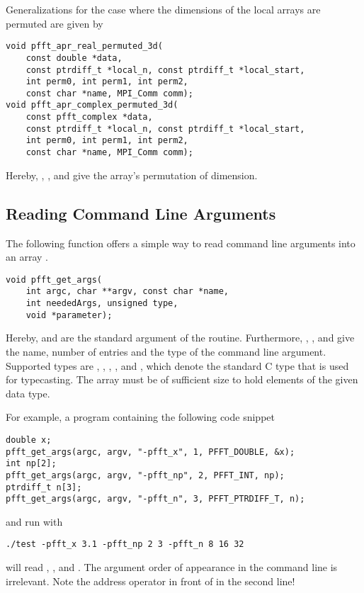 Generalizations for the case where the dimensions of the local arrays are permuted are given by
\begin{lstlisting}
void pfft_apr_real_permuted_3d(
    const double *data,
    const ptrdiff_t *local_n, const ptrdiff_t *local_start,
    int perm0, int perm1, int perm2,
    const char *name, MPI_Comm comm);
void pfft_apr_complex_permuted_3d(
    const pfft_complex *data,
    const ptrdiff_t *local_n, const ptrdiff_t *local_start,
    int perm0, int perm1, int perm2,
    const char *name, MPI_Comm comm);
\end{lstlisting}
Hereby, , , and  give the array's permutation of dimension.





\subsection{Reading Command Line Arguments}
The following function offers a simple way to read command line arguments into an array .
\begin{lstlisting}
void pfft_get_args(
    int argc, char **argv, const char *name,
    int neededArgs, unsigned type,
    void *parameter);
\end{lstlisting}
Hereby,  and  are the standard argument of the  routine.
Furthermore, , , and  give the name, number of entries and the type of the command line argument.
Supported types are , , , , and ,
which denote the standard C type that is used for typecasting.
The array  must be of sufficient size to hold  elements of the given data type.

For example, a program  containing the following code snippet
\begin{lstlisting}
double x;
pfft_get_args(argc, argv, "-pfft_x", 1, PFFT_DOUBLE, &x);
int np[2];
pfft_get_args(argc, argv, "-pfft_np", 2, PFFT_INT, np);
ptrdiff_t n[3];
pfft_get_args(argc, argv, "-pfft_n", 3, PFFT_PTRDIFF_T, n);
\end{lstlisting}
and run with
\begin{lstlisting}
./test -pfft_x 3.1 -pfft_np 2 3 -pfft_n 8 16 32
\end{lstlisting}
will read , , and .
The argument order of appearance in the command line is irrelevant.
Note the address operator \code{&} in front of  in the second line!

